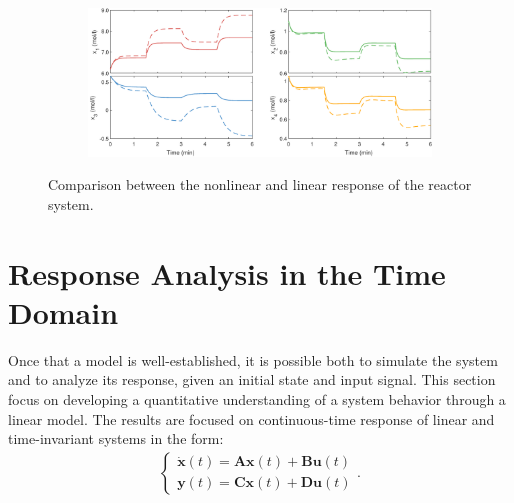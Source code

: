 \documentclass[a4paper,11pt]{book}
\numberwithin{figure}{chapter}
\numberwithin{equation}{chapter}
\numberwithin{table}{chapter}
\theoremstyle{definition}
\begin{document}
\begin{figure}[ht] \centering
	\begin{subfigure}{0.9\textwidth}
	\end{subfigure} \\
    \begin{subfigure}{0.9\textwidth}
    	\includegraphics[width=\textwidth]{chapter2/linResp_1_2}
	\end{subfigure}
	
    \caption{Comparison between the nonlinear and linear response of the reactor system.}
    \label{fig:linResp01}
\end{figure}

\section{Response Analysis in the Time Domain}

Once that a model is well-established, it is possible both to simulate the system and to analyze its response, given an initial state and input signal. This section focus on developing a quantitative understanding of a system behavior through a linear model. The results are focused on continuous-time response of linear and time-invariant systems in the form:
\begin{align}
\begin{cases}
    \dot{\bm{x}}(t) = \bm{A} \bm{x}(t) + \bm{B} \bm{u}(t) \\
    \bm{y}(t) = \bm{C} \bm{x}(t) + \bm{D} \bm{u}(t)
\end{cases}
.\end{align}
\end{document}
